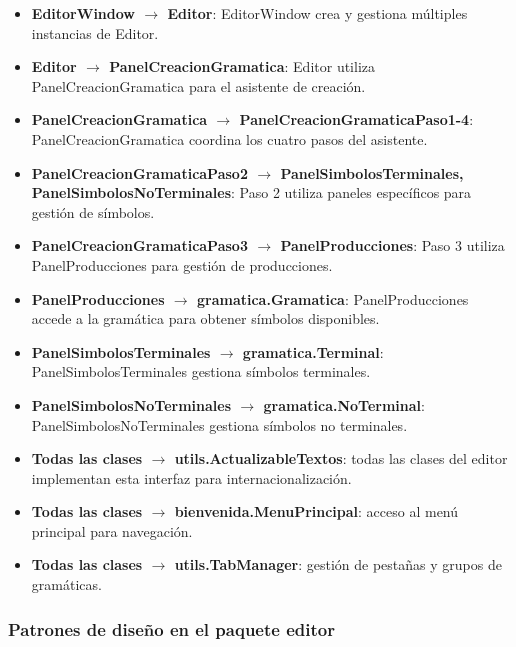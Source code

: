 \begin{itemize}
    \item \textbf{EditorWindow $\rightarrow$ Editor}: EditorWindow crea y gestiona múltiples instancias de Editor.
    \item \textbf{Editor $\rightarrow$ PanelCreacionGramatica}: Editor utiliza PanelCreacionGramatica para el asistente de creación.
    \item \textbf{PanelCreacionGramatica $\rightarrow$ PanelCreacionGramaticaPaso1-4}: PanelCreacionGramatica coordina los cuatro pasos del asistente.
    \item \textbf{PanelCreacionGramaticaPaso2 $\rightarrow$ PanelSimbolosTerminales, PanelSimbolosNoTerminales}: Paso 2 utiliza paneles específicos para gestión de símbolos.
    \item \textbf{PanelCreacionGramaticaPaso3 $\rightarrow$ PanelProducciones}: Paso 3 utiliza PanelProducciones para gestión de producciones.
    \item \textbf{PanelProducciones $\rightarrow$ gramatica.Gramatica}: PanelProducciones accede a la gramática para obtener símbolos disponibles.
    \item \textbf{PanelSimbolosTerminales $\rightarrow$ gramatica.Terminal}: PanelSimbolosTerminales gestiona símbolos terminales.
    \item \textbf{PanelSimbolosNoTerminales $\rightarrow$ gramatica.NoTerminal}: PanelSimbolosNoTerminales gestiona símbolos no terminales.
    \item \textbf{Todas las clases $\rightarrow$ utils.ActualizableTextos}: todas las clases del editor implementan esta interfaz para internacionalización.
    \item \textbf{Todas las clases $\rightarrow$ bienvenida.MenuPrincipal}: acceso al menú principal para navegación.
    \item \textbf{Todas las clases $\rightarrow$ utils.TabManager}: gestión de pestañas y grupos de gramáticas.
\end{itemize}

\subsubsection{Patrones de diseño en el paquete editor}

